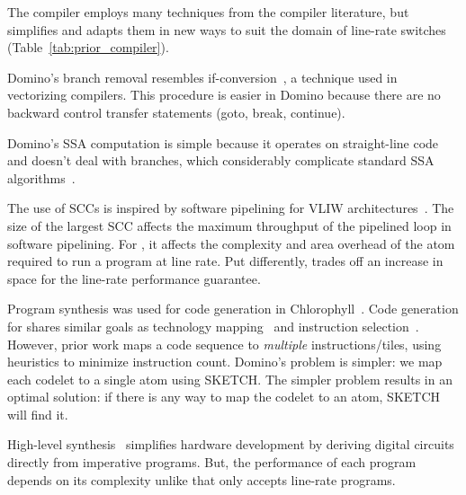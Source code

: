 The \pktlanguage compiler employs many techniques from the compiler literature,
but simplifies and adapts them in new ways to suit the domain of line-rate
switches (Table~\ref{tab:prior_compiler}).
\begin{CompactEnumerate}
  \item Domino's branch removal resembles if-conversion~\cite{if_conversion}, a
    technique used in vectorizing compilers. This procedure is easier in Domino
    because there are no backward control transfer statements (goto, break,
    continue).
  \item Domino's SSA computation is simple because it operates on
    straight-line code and doesn't deal with branches, which considerably
    complicate standard SSA algorithms~\cite{ssa}.
  \item The use of SCCs is inspired by software pipelining for VLIW
    architectures~\cite{software_pipelining}. The size of the largest SCC
    affects the maximum throughput of the pipelined loop in software
    pipelining. For \pktlanguage, it affects the complexity and area overhead
    of the atom required to run a program at line rate. Put differently,
    \pktlanguage trades off an increase in space for the line-rate performance
    guarantee.
  \item Program synthesis was used for code generation in
    Chlorophyll~\cite{chlorophyll}.  Code generation for \pktlanguage shares
    similar goals as technology mapping~\cite{micheli, flowmap, spectransform}
    and instruction selection~\cite{muchnik}.  However, prior work maps a code
    sequence to \textit{multiple} instructions/tiles, using heuristics to
    minimize instruction count. Domino's problem is simpler: we map each
    codelet to a single atom using SKETCH.  The simpler problem results in an
    optimal solution: if there is any way to map the codelet to an atom, SKETCH
    will find it.
  \item High-level synthesis~\cite{nurvadathi, cash, bluespec, vivado}
    simplifies hardware development by deriving digital circuits directly from
    imperative programs. But, the performance of each program depends on its
    complexity unlike \pktlanguage that only accepts line-rate programs.
\end{CompactEnumerate}

